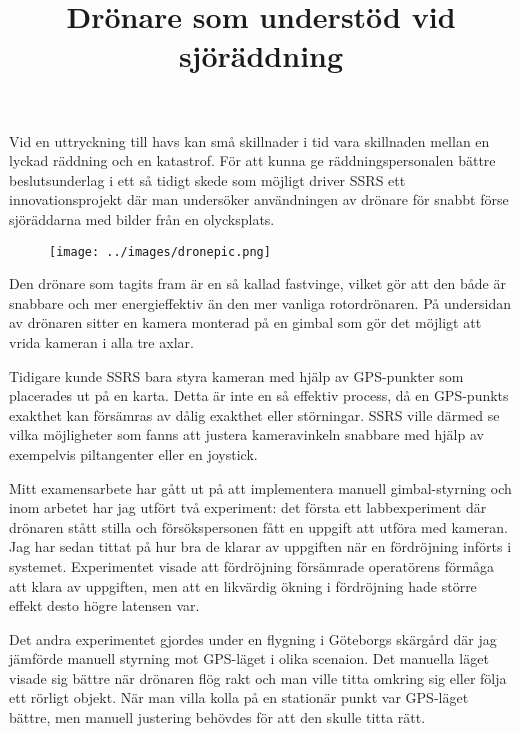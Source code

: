 \documentclass{popsci}
\title{Drönare som understöd vid sjöräddning}
\begin{document}

{\noindent Vid en uttryckning till havs kan små skillnader i tid vara skillnaden mellan en lyckad räddning och en katastrof. För att kunna ge räddningspersonalen bättre beslutsunderlag i ett så tidigt skede som möjligt driver SSRS ett innovationsprojekt där man undersöker användningen av drönare för snabbt förse sjöräddarna med bilder från en olycksplats.

\begin{figure}[!bth] %
    \texttt{[image: ../images/dronepic.png]} 
\end{figure}

Den drönare som tagits fram är en så kallad fastvinge, vilket gör att den både är snabbare och mer energieffektiv än den mer vanliga rotordrönaren. På undersidan av drönaren sitter en kamera monterad på en gimbal som gör det möjligt att vrida kameran i alla tre axlar.

Tidigare kunde SSRS bara styra kameran med hjälp av GPS-punkter som placerades ut på en karta. Detta är inte en så effektiv process, då en GPS-punkts exakthet kan försämras av dålig exakthet eller störningar. SSRS ville därmed se vilka möjligheter som fanns att justera kameravinkeln snabbare med hjälp av exempelvis piltangenter eller en joystick.

Mitt examensarbete har gått ut på att implementera manuell gimbal-styrning och inom arbetet har jag utfört två experiment: det första ett labbexperiment där drönaren stått stilla och försökspersonen fått en uppgift att utföra med kameran. Jag har sedan tittat på hur bra de klarar av uppgiften när en fördröjning införts i systemet. Experimentet visade att fördröjning försämrade operatörens förmåga att klara av uppgiften, men att en likvärdig ökning i fördröjning hade större effekt desto högre latensen var.

Det andra experimentet gjordes under en flygning i Göteborgs skärgård där jag jämförde manuell styrning mot GPS-läget i olika scenaion. Det manuella läget visade sig bättre när drönaren flög rakt och man ville titta omkring sig eller följa ett rörligt objekt. När man villa kolla på en stationär punkt var GPS-läget bättre, men manuell justering behövdes för att den skulle titta rätt. 
}
\end{document}
